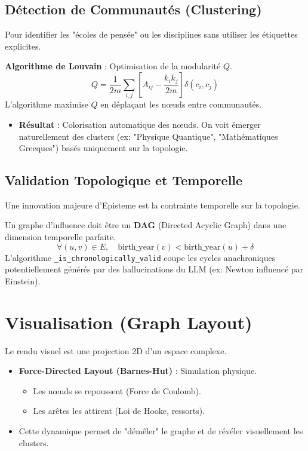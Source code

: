 \documentclass[12pt,a4paper]{report}
\begin{document}
\subsection{Détection de Communautés (Clustering)}
Pour identifier les "écoles de pensée" ou les disciplines sans utiliser les étiquettes explicites.

\textbf{Algorithme de Louvain} : Optimisation de la modularité $Q$.
$$Q = \frac{1}{2m} \sum_{i,j} \left[ A_{ij} - \frac{k_i k_j}{2m} \right] \delta(c_i, c_j)$$
L'algorithme maximise $Q$ en déplaçant les nœuds entre communautés.
\begin{itemize}
    \item \textbf{Résultat} : Colorisation automatique des nœuds. On voit émerger naturellement des clusters (ex: "Physique Quantique", "Mathématiques Grecques") basés uniquement sur la topologie.
\end{itemize}

\subsection{Validation Topologique et Temporelle}
Une innovation majeure d'Episteme est la contrainte temporelle sur la topologie.
\begin{info}
Un graphe d'influence doit être un \textbf{DAG} (Directed Acyclic Graph) dans une dimension temporelle parfaite.
\begin{equation}
    \forall (u, v) \in E, \quad \text{birth\_year}(v) < \text{birth\_year}(u) + \delta
\end{equation}
L'algorithme \texttt{\_is\_chronologically\_valid} coupe les cycles anachroniques potentiellement générés par des hallucinations du LLM (ex: Newton influencé par Einstein).
\end{info}

\section{Visualisation (Graph Layout)}
Le rendu visuel est une projection 2D d'un espace complexe.
\begin{itemize}
    \item \textbf{Force-Directed Layout (Barnes-Hut)} : Simulation physique.
    \begin{itemize}
        \item Les nœuds se repoussent (Force de Coulomb).
        \item Les arêtes les attirent (Loi de Hooke, ressorts).
    \end{itemize}
    \item Cette dynamique permet de "démêler" le graphe et de révéler visuellement les clusters.
\end{itemize}
\end{document}
